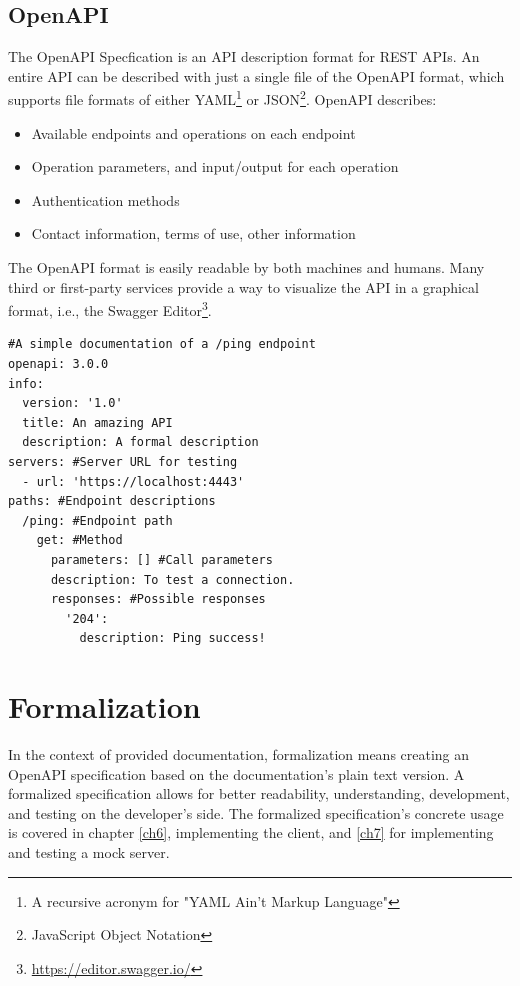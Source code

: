 \subsection*{OpenAPI}
The OpenAPI Specfication is an API description format for REST APIs. An entire API can be described with just a single file of the OpenAPI format, which supports file formats of either YAML\footnote{A recursive acronym for "YAML Ain't Markup Language"} or JSON\footnote{JavaScript Object Notation}. OpenAPI describes:

\begin{itemize}
    \item Available endpoints and operations on each endpoint
    \item Operation parameters, and input/output for each operation
    \item Authentication methods
    \item Contact information, terms of use, other information
\end{itemize}

The OpenAPI format is easily readable by both machines and humans. Many third or first-party services provide a way to visualize the API in a graphical format, i.e., the Swagger Editor\footnote{\url{https://editor.swagger.io/}}.\cite{SwaggerDocs}

\newpage
\begin{lstlisting}[caption={An example of an OpenAPI file in the YAML format}, label=openapiex]
#A simple documentation of a /ping endpoint
openapi: 3.0.0 
info:
  version: '1.0' 
  title: An amazing API
  description: A formal description
servers: #Server URL for testing
  - url: 'https://localhost:4443'
paths: #Endpoint descriptions
  /ping: #Endpoint path
    get: #Method
      parameters: [] #Call parameters
      description: To test a connection.
      responses: #Possible responses
        '204':
          description: Ping success!
\end{lstlisting}


\section{Formalization}
In the context of provided documentation, formalization means creating an OpenAPI specification based on the documentation's plain text version. A formalized specification allows for better readability, understanding, development, and testing on the developer's side. The formalized specification's concrete usage is covered in chapter \ref{ch6}, implementing the client, and \ref{ch7} for implementing and testing a mock server.


